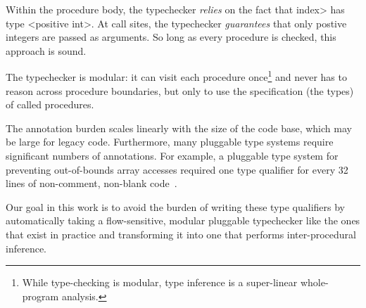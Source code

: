 Within the procedure body, the typechecker \emph{relies} on the fact that
\<index> has type <positive int>.  At call sites, the typechecker
\emph{guarantees} that only postive integers are passed as arguments.  So
long as every procedure is checked, this approach is sound.

The typechecker is modular:  it can visit each procedure
once\footnote{While type-checking is modular, type inference is a
super-linear whole-program analysis.}
and never has to reason across procedure
boundaries, but only to use the specification (the types) of called procedures.

The annotation burden scales linearly with the size of the code
base, which may be large for legacy code.  Furthermore,
many pluggable type systems require significant numbers of annotations.
For example, a pluggable type system for preventing out-of-bounds array accesses
required
one type qualifier for every 32 lines of non-comment, non-blank code~\cite{KelloggDME2018}.

Our goal in this work is to avoid the burden of writing these type qualifiers
by automatically taking a flow-sensitive, modular pluggable typechecker
like the ones that exist in practice and transforming it into one that performs
inter-procedural inference.

